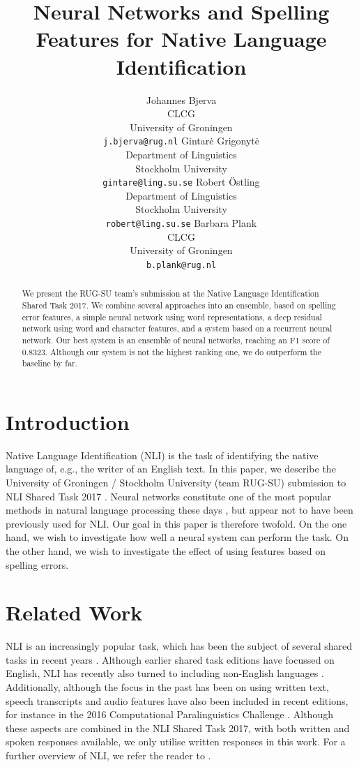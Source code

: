 \documentclass[11pt,letterpaper]{article}
\title{Neural Networks and Spelling Features for Native Language Identification}
\author{Johannes Bjerva \\ CLCG \\ University of Groningen \\ {\tt j.bjerva@rug.nl}
        \And Gintar\.e Grigonyt\.e \\ Department of Linguistics \\ Stockholm University \\ {\tt gintare@ling.su.se}
        \AND Robert {\"O}stling \\ Department of Linguistics \\  Stockholm University \\ {\tt robert@ling.su.se}
        \And Barbara Plank \\ CLCG \\ University of Groningen \\ {\tt b.plank@rug.nl}
}
\date{}
\begin{document}
\maketitle

\begin{abstract}
    We present the RUG-SU team's submission at the Native
    Language Identification Shared Task 2017.
    We combine several approaches into an ensemble, based on spelling error features, a simple neural network using word representations, a deep residual network using word and character features, and a system based on a recurrent neural network. Our best system is an ensemble of neural networks, reaching an F1 score of 0.8323.
    Although our system is not the highest ranking one, we do outperform the baseline by far.
\end{abstract}


\section{Introduction}

Native Language Identification (NLI) is the task of identifying the native language of, e.g., the writer of an English text.
In this paper, we describe the University of Groningen / Stockholm University (team RUG-SU) submission to NLI Shared Task 2017 \citep{nli2017}.
Neural networks constitute one of the most popular methods in natural language processing these days \citep{manning:2016}, but appear not to have been previously used for NLI.
Our goal in this paper is therefore twofold.
On the one hand, we wish to investigate how well a neural system can perform the task.
On the other hand, we wish to investigate the effect of using features based on spelling errors.

\section{Related Work}

NLI is an increasingly popular task, which has been the subject of several shared tasks in recent years \citep{nli2013,compare2016,nli2017}.
Although earlier shared task editions have focussed on English, NLI has recently also turned to including non-English languages \citep{multilingual-nli}.
Additionally, although the focus in the past has been on using written text, speech transcripts and audio features have also been included in recent editions, for instance in the 2016 Computational Paralinguistics Challenge \citep{compare2016}.
Although these aspects are combined in the NLI Shared Task 2017, with both written and spoken responses available, we only utilise written responses in this work.
For a further overview of NLI, we refer the reader to \citet{malmasi2016}.
\end{document}
